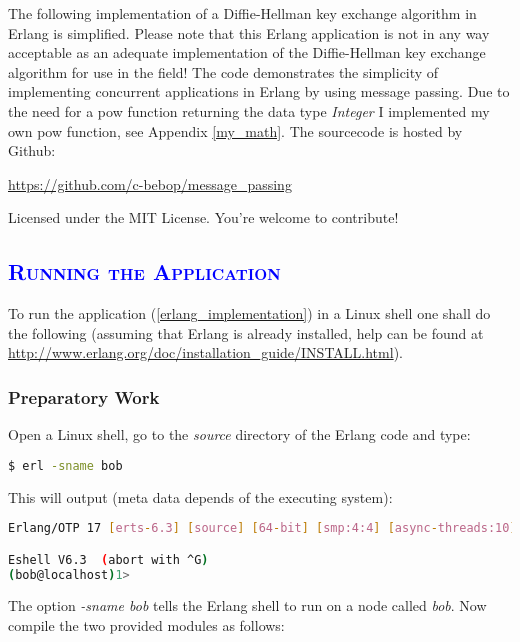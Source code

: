 \documentclass[xcolor=dvipsnames]{article}
\begin{document}
The following implementation of a Diffie-Hellman key exchange algorithm in Erlang is simplified. Please note that this Erlang application is not in any way acceptable as an adequate implementation of the Diffie-Hellman key exchange algorithm for use in the field! The code demonstrates the simplicity of implementing concurrent applications in Erlang by using message passing. Due to the need for a pow function returning the data type \textit{Integer} I implemented my own pow function, see Appendix \ref{my_math}. The sourcecode is hosted by Github:

\begin{center}
\url{https://github.com/c-bebop/message_passing}
\end{center}

\noindent Licensed under the MIT License. You're welcome to contribute!



\subsection{\scshape{\textcolor{blue}{Running the Application}}}

To run the application (\ref{erlang_implementation}) in a Linux shell one shall do the following (assuming that Erlang is already installed, help can be found at \url{http://www.erlang.org/doc/installation_guide/INSTALL.html}).

\subsubsection{Preparatory Work}

\noindent Open a Linux shell, go to the \textit{source} directory of the Erlang code and type:

\begin{lstlisting}[language=bash, numbers=none]
$ erl -sname bob
\end{lstlisting}

\noindent This will output (meta data depends of the executing system):

\begin{lstlisting}[language=bash]
Erlang/OTP 17 [erts-6.3] [source] [64-bit] [smp:4:4] [async-threads:10] [hipe] [kernel-poll:false]

Eshell V6.3  (abort with ^G)
(bob@localhost)1> 
\end{lstlisting}

\noindent The option \textit{-sname bob} tells the Erlang shell to run on a node called \textit{bob}. Now compile the two provided modules as follows:
\end{document}
